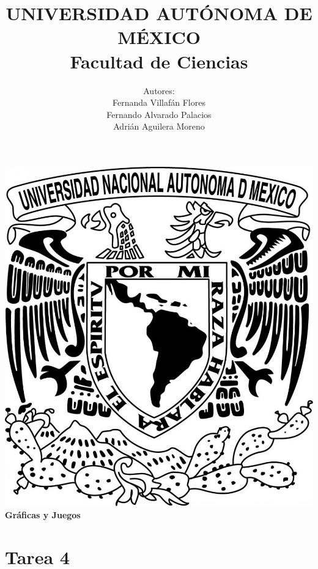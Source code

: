 \documentclass{article}
\begin{document}
\title{UNIVERSIDAD AUT\'ONOMA DE M\'EXICO\\ Facultad de Ciencias}
\author{Autores:
  \\ Fernanda Villaf\'an Flores
  \\ Fernando Alvarado Palacios
  \\ Adri\'an Aguilera Moreno}
\date{}
\maketitle
\begin{center}
  \includegraphics[scale=0.20]{../Imagen/Portada.jpg}\\[0.4cm]
  \Large
  \bf{Gr\'aficas y Juegos}
  \normalsize
\end{center}
\newpage
{}
\section*{\LARGE{Tarea 4}}
\end{document}
